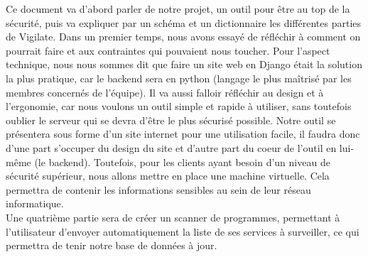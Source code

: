 Ce document va d'abord parler de notre projet, un outil pour être au top de la sécurité, puis va expliquer par un schéma et un dictionnaire les différentes parties de Vigilate. Dans un premier temps, nous avons essayé de réfléchir à comment on pourrait faire et aux contraintes qui pouvaient nous toucher. Pour l'aspect technique, nous nous sommes dit que faire un site web en Django était la solution la plus pratique, car le backend sera en python (langage le plus maîtrisé par les membres concernés de l'équipe). Il va aussi falloir réfléchir au design et à l'ergonomie, car nous voulons un outil simple et rapide à utiliser, sans toutefois oublier le serveur qui se devra d'être le plus sécurisé possible. Notre outil se présentera sous forme d'un site internet pour une utilisation facile, il faudra donc d'une part s'occuper du design du site et d'autre part du coeur de l'outil en lui-même (le backend). Toutefois, pour les clients ayant besoin d'un niveau de sécurité supérieur, nous allons mettre en place une machine virtuelle. Cela permettra de contenir les informations sensibles au sein de leur réseau informatique.\\
Une quatrième partie sera de créer un scanner de programmes, permettant à l'utilisateur d'envoyer automatiquement la liste de ses services à surveiller, ce qui permettra de tenir notre base de données à jour.\\